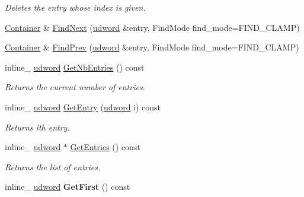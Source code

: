 \begin{DoxyCompactItemize}
\begin{DoxyCompactList}\small\item\em Deletes the entry whose index is given. \end{DoxyCompactList}\item 
\hyperlink{classContainer}{Container} \& \hyperlink{classContainer_aba8a86ac1c2a2886e5288ad37140c3d7}{Find\+Next} (\hyperlink{IceTypes_8h_a44c6f1920ba5551225fb534f9d1a1733}{udword} \&entry, Find\+Mode find\+\_\+mode=F\+I\+N\+D\+\_\+\+C\+L\+A\+MP)
\item 
\hyperlink{classContainer}{Container} \& \hyperlink{classContainer_a81363f8e9b925fe4d736fd3f3ab5c879}{Find\+Prev} (\hyperlink{IceTypes_8h_a44c6f1920ba5551225fb534f9d1a1733}{udword} \&entry, Find\+Mode find\+\_\+mode=F\+I\+N\+D\+\_\+\+C\+L\+A\+MP)
\item 
inline\+\_\+ \hyperlink{IceTypes_8h_a44c6f1920ba5551225fb534f9d1a1733}{udword} \hyperlink{classContainer_af970efd22b612ec421c0b3e44a484631}{Get\+Nb\+Entries} () const \hypertarget{classContainer_af970efd22b612ec421c0b3e44a484631}{}\label{classContainer_af970efd22b612ec421c0b3e44a484631}

\begin{DoxyCompactList}\small\item\em Returns the current number of entries. \end{DoxyCompactList}\item 
inline\+\_\+ \hyperlink{IceTypes_8h_a44c6f1920ba5551225fb534f9d1a1733}{udword} \hyperlink{classContainer_a1cf43c7ba75d50806837359a35233a5d}{Get\+Entry} (\hyperlink{IceTypes_8h_a44c6f1920ba5551225fb534f9d1a1733}{udword} i) const \hypertarget{classContainer_a1cf43c7ba75d50806837359a35233a5d}{}\label{classContainer_a1cf43c7ba75d50806837359a35233a5d}

\begin{DoxyCompactList}\small\item\em Returns ith entry. \end{DoxyCompactList}\item 
inline\+\_\+ \hyperlink{IceTypes_8h_a44c6f1920ba5551225fb534f9d1a1733}{udword} $\ast$ \hyperlink{classContainer_a1f1684b828d5eca692962de4f2fa7e63}{Get\+Entries} () const \hypertarget{classContainer_a1f1684b828d5eca692962de4f2fa7e63}{}\label{classContainer_a1f1684b828d5eca692962de4f2fa7e63}

\begin{DoxyCompactList}\small\item\em Returns the list of entries. \end{DoxyCompactList}\item 
inline\+\_\+ \hyperlink{IceTypes_8h_a44c6f1920ba5551225fb534f9d1a1733}{udword} {\bfseries Get\+First} () const \hypertarget{classContainer_af6a9dce121bf062e798893a8cd4d0cf0}{}\label{classContainer_af6a9dce121bf062e798893a8cd4d0cf0}


\end{DoxyCompactItemize}

